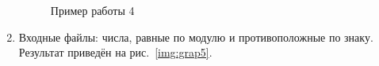 \documentclass[12pt, a4paper]{article}
\begin{document}
\begin{enumerate}
\begin{figure}[h]
  		\caption{Пример работы 4}
  		\label{img:grap4}
	\end{figure}
	\newpage
	\item Входные файлы: числа, равные по модулю и противоположные по 
	знаку.
	Результат приведён на рис.~\ref{img:grap5}.
	\begin{figure}[h]

\end{figure}
\end{enumerate}
\end{document}
